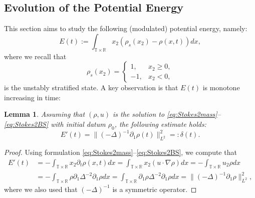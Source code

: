 \documentclass[11pt]{article}
\numberwithin{equation}{section}
\newtheorem{lem}[thm]{Lemma}
\newcommand{\R}{\mathbb{R}}
\newcommand{\T}{\mathbb{T}}
\newcommand{\p}{\partial}
\begin{document}
\subsection{Evolution of the Potential Energy}
\label{sec_energy}
This section aims to study the following (modulated) potential energy, namely:
$$
E(t) := \int_{\T \times \R} x_2 (\rho_s(x_2) - \rho(x,t))dx,
$$
where we recall that
$$
\rho_s(x_2) = \begin{cases}
    1, & x_2 \ge 0,\\
    -1, & x_2 < 0,
\end{cases}
$$
is the unstably stratified state. 
A key observation is that $E(t)$ is monotone increasing in time:
\begin{lem}\label{lem:dtE}
    Assuming that $(\rho,u)$ is the solution to \eqref{eq:Stokes2mass}--\eqref{eq:Stokes2BS} with initial datum $\rho_0$, the following estimate holds:
    \begin{equation}\label{eq:potential}
    E'(t) = \|(-\Delta)^{-1}\p_1 \rho(t)\|_{L^2}^2 =: \delta(t).
    \end{equation}
\end{lem}
\begin{proof}
    Using formulation \eqref{eq:Stokes2mass}--\eqref{eq:Stokes2BS}, we compute that
    \begin{align*}
        E'(t) &= -\int_{\T \times \R}x_2 \p_t \rho(x,t) dx = \int_{\T \times \R} x_2 (u\cdot\nabla \rho)dx= -\int_{\T \times \R} u_2 \rho dx\\ &= -\int_{\T \times \R} \rho \p_1\Delta^{-2}\p_1 \rho dx= \int_{\T \times \R} \p_1\rho \Delta^{-2}\p_1 \rho dx= \|(-\Delta)^{-1}\p_1 \rho\|_{L^2}^2,
    \end{align*}
    where we also used that $(-\Delta)^{-1}$ is a symmetric operator.
\end{proof}
\end{document}
